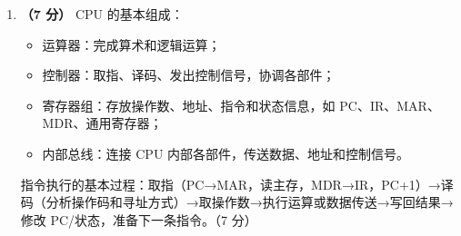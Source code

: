 \documentclass[a4paper,11pt]{article}
\begin{document}
\begin{enumerate}[start=1, label=\textbf{\arabic*.}, leftmargin=2.4em, itemsep=0.45em]
\item \textbf{（7 分）}
CPU 的基本组成：
\begin{itemize}[leftmargin=1.8em, itemsep=1pt]
  \item 运算器：完成算术和逻辑运算；
  \item 控制器：取指、译码、发出控制信号，协调各部件；
  \item 寄存器组：存放操作数、地址、指令和状态信息，如 PC、IR、MAR、MDR、通用寄存器；
  \item 内部总线：连接 CPU 内部各部件，传送数据、地址和控制信号。
\end{itemize}
指令执行的基本过程：取指（PC→MAR，读主存，MDR→IR，PC+1）→译码（分析操作码和寻址方式）→取操作数→执行运算或数据传送→写回结果→修改 PC/状态，准备下一条指令。\hfill（7 分）

\end{enumerate}

\end{document}
